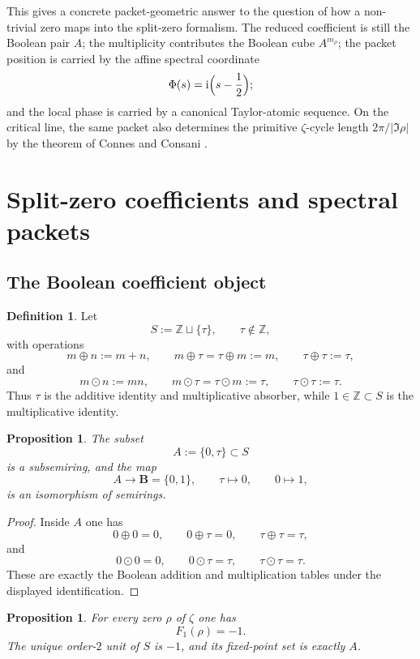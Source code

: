 \documentclass[11pt]{amsart}
\numberwithin{equation}{section}
\newtheorem{proposition}[theorem]{Proposition}
\theoremstyle{definition}
\newtheorem{definition}[theorem]{Definition}
\theoremstyle{remark}
\newcommand{\ZZ}{\mathbb Z}
\newcommand{\BB}{\mathbf B}
\newcommand{\taup}{\tau}
\newcommand{\ii}{\mathrm i}
\begin{document}
This gives a concrete packet-geometric answer to the question of how a non-trivial zero maps into the split-zero formalism.  The reduced coefficient is still the Boolean pair $A$; the multiplicity contributes the Boolean cube $A^{m_\rho}$; the packet position is carried by the affine spectral coordinate
\[
\Phi(s)=\ii\Bigl(s-\frac12\Bigr);
\]
and the local phase is carried by a canonical Taylor-atomic sequence.  On the critical line, the same packet also determines the primitive $\zeta$-cycle length $2\pi/|\Im\rho|$ by the theorem of Connes and Consani \cite{ConnesConsaniCycles}.

\section{Split-zero coefficients and spectral packets}

\subsection{The Boolean coefficient object}

\begin{definition}
Let
\[
S:=\ZZ\sqcup\{\taup\},\qquad \taup\notin\ZZ,
\]
with operations
\[
m\oplus n:=m+n,
\qquad
m\oplus \taup=\taup\oplus m:=m,
\qquad
\taup\oplus\taup:=\taup,
\]
and
\[
m\odot n:=mn,
\qquad
m\odot\taup=\taup\odot m:=\taup,
\qquad
\taup\odot\taup:=\taup.
\]
Thus $\taup$ is the additive identity and multiplicative absorber, while $1\in\ZZ\subset S$ is the multiplicative identity.
\end{definition}

\begin{proposition}\label{prop:boolean-pair}
The subset
\[
A:=\{0,\taup\}\subset S
\]
is a subsemiring, and the map
\[
A\longrightarrow \BB=\{0,1\},\qquad \taup\mapsto 0,\qquad 0\mapsto 1,
\]
is an isomorphism of semirings.
\end{proposition}

\begin{proof}
Inside $A$ one has
\[
0\oplus0=0,
\qquad
0\oplus\taup=0,
\qquad
\taup\oplus\taup=\taup,
\]
and
\[
0\odot0=0,
\qquad
0\odot\taup=\taup,
\qquad
\taup\odot\taup=\taup.
\]
These are exactly the Boolean addition and multiplication tables under the displayed identification.
\end{proof}

\begin{proposition}\label{prop:F1-zero}
For every zero $\rho$ of $\zeta$ one has
\[
F_1(\rho)=-1.
\]
The unique order-$2$ unit of $S$ is $-1$, and its fixed-point set is exactly $A$.
\end{proposition}
\end{document}
